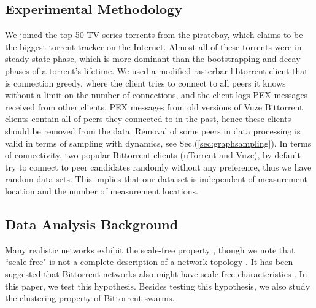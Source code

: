 \documentclass[paper]{ieice}
\begin{document}
\subsection{Experimental Methodology}
We joined the top 50 TV series torrents from the piratebay, which claims to be the biggest torrent tracker on the Internet.
Almost all of these torrents were in steady-state phase, which is more dominant than the bootstrapping and decay phases of a torrent's lifetime.
We used a modified rasterbar libtorrent \cite{rasterbar} client that is connection greedy, where the client tries to connect to all peers it knows without a limit on the number of connections, and the client logs PEX messages received from other clients.
PEX messages from old versions of Vuze Bittorrent clients contain all of peers they connected to in the past, hence these clients should be removed from the data.
Removal of some peers in data processing is valid in terms of sampling with dynamics, see Sec.(\ref{sec:graphsampling}).
In terms of connectivity, two popular Bittorrent clients (uTorrent and Vuze), by default try to connect to peer candidates randomly without any preference, thus we have random data sets.
This implies that our data set is independent of measurement location and the number of measurement locations.

\subsection{Data Analysis Background}
Many realistic networks exhibit the scale-free property \cite{clauset2009power}, though we note that ``scale-free" is not a complete description of a network topology \cite{doyle2005robust}\cite{mahadevan2006systematic}. 
It has been suggested that Bittorrent networks also might have scale-free characteristics \cite{dale2008evolution}. 
In this paper, we test this hypothesis. 
Besides testing this hypothesis, we also study the clustering property of Bittorrent swarms. 
\end{document}

